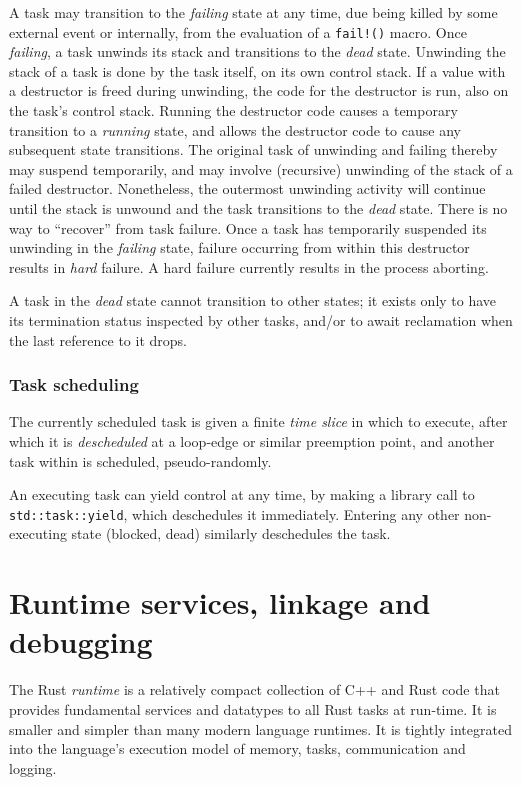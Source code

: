 \documentclass[]{article}
\begin{document}
A task may transition to the \emph{failing} state at any time, due being
killed by some external event or internally, from the evaluation of a
\texttt{fail!()} macro. Once \emph{failing}, a task unwinds its stack
and transitions to the \emph{dead} state. Unwinding the stack of a task
is done by the task itself, on its own control stack. If a value with a
destructor is freed during unwinding, the code for the destructor is
run, also on the task's control stack. Running the destructor code
causes a temporary transition to a \emph{running} state, and allows the
destructor code to cause any subsequent state transitions. The original
task of unwinding and failing thereby may suspend temporarily, and may
involve (recursive) unwinding of the stack of a failed destructor.
Nonetheless, the outermost unwinding activity will continue until the
stack is unwound and the task transitions to the \emph{dead} state.
There is no way to ``recover'' from task failure. Once a task has
temporarily suspended its unwinding in the \emph{failing} state, failure
occurring from within this destructor results in \emph{hard} failure. A
hard failure currently results in the process aborting.

A task in the \emph{dead} state cannot transition to other states; it
exists only to have its termination status inspected by other tasks,
and/or to await reclamation when the last reference to it drops.

\subsubsection{Task scheduling}\label{task-scheduling}

The currently scheduled task is given a finite \emph{time slice} in
which to execute, after which it is \emph{descheduled} at a loop-edge or
similar preemption point, and another task within is scheduled,
pseudo-randomly.

An executing task can yield control at any time, by making a library
call to \texttt{std::task::yield}, which deschedules it immediately.
Entering any other non-executing state (blocked, dead) similarly
deschedules the task.

\section{Runtime services, linkage and
debugging}\label{runtime-services-linkage-and-debugging}

The Rust \emph{runtime} is a relatively compact collection of C++ and
Rust code that provides fundamental services and datatypes to all Rust
tasks at run-time. It is smaller and simpler than many modern language
runtimes. It is tightly integrated into the language's execution model
of memory, tasks, communication and logging.
\end{document}
